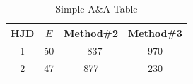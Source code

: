 \documentclass{aa}
\begin{document}
\begin{table}[h!]
\caption{Simple A\&A Table}                 %
\label{table:1}    %
\centering                        %
\begin{tabular}{c c c c}      %
\hline\hline               %
HJD & $E$ & Method\#2 & Method\#3 \\         %
\hline                      %
   1 & 50 & $-837$ & 970 \\    %
   2 & 47 & 877    & 230 \\
\hline                                  %
\end{tabular}
\end{table}
\end{document}
